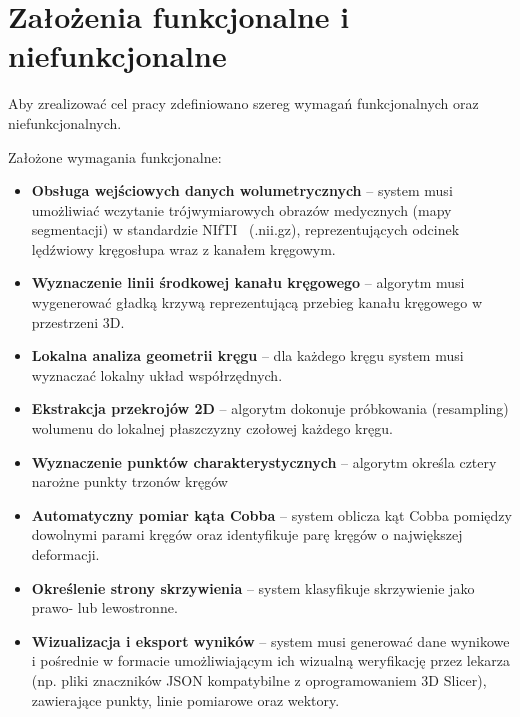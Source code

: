 \section{Założenia funkcjonalne i niefunkcjonalne}
\label{sec:skolioza-zalozenia}
Aby zrealizować cel pracy zdefiniowano szereg wymagań funkcjonalnych oraz niefunkcjonalnych.

Założone wymagania funkcjonalne:

\begin{itemize}
    \item \textbf{Obsługa wejściowych danych wolumetrycznych} -- system musi umożliwiać wczytanie trójwymiarowych obrazów medycznych (mapy segmentacji) w standardzie NIfTI~\cite{nifti} (.nii.gz), reprezentujących odcinek lędźwiowy kręgosłupa wraz z kanałem kręgowym.
    \item \textbf{Wyznaczenie linii środkowej kanału kręgowego} -- algorytm musi wygenerować gładką krzywą reprezentującą przebieg kanału kręgowego w przestrzeni 3D.
    \item \textbf{Lokalna analiza geometrii kręgu} -- dla każdego kręgu system musi wyznaczać lokalny układ współrzędnych.
    \item \textbf{Ekstrakcja przekrojów 2D} -- algorytm dokonuje próbkowania (resampling) wolumenu do lokalnej płaszczyzny czołowej każdego kręgu.
    \item \textbf{Wyznaczenie punktów charakterystycznych} -- algorytm określa cztery narożne punkty trzonów kręgów
    \item \textbf{Automatyczny pomiar kąta Cobba} -- system oblicza kąt Cobba pomiędzy dowolnymi parami kręgów oraz identyfikuje parę kręgów o największej deformacji.
    \item \textbf{Określenie strony skrzywienia} -- system klasyfikuje skrzywienie jako prawo- lub lewostronne.
    \item \textbf{Wizualizacja i eksport wyników} -- system musi generować dane wynikowe i pośrednie w formacie umożliwiającym ich wizualną weryfikację przez lekarza (np. pliki znaczników JSON kompatybilne z oprogramowaniem 3D Slicer), zawierające punkty, linie pomiarowe oraz wektory.
\end{itemize}

